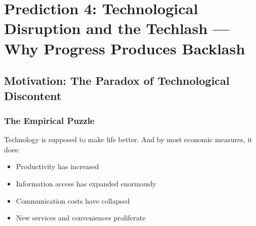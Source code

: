 \section{Prediction 4: Technological Disruption and the Techlash --- Why Progress Produces Backlash}
\label{app:prediction-techlash}


\begin{abstract}
This appendix provides the complete technical foundation for Prediction 4 of the 
Complementarity-Context Framework: that rapid technological change triggers 
``techlash''---public backlash against technology---not despite its benefits but 
\emph{because} of asymmetric effects across welfare dimensions. We develop the 
formal model linking technology shocks to context ($\Psi$) and welfare (FEPSDE), 
demonstrate how populations with different welfare weights experience net gains 
or losses, validate against survey data on technology attitudes, and derive 
demographic predictions for techlash concentration. The analysis explains why 
the most technologically advanced societies exhibit the strongest technology skepticism.
\end{abstract}

\subsection{Motivation: The Paradox of Technological Discontent}

\subsubsection{The Empirical Puzzle}

Technology is supposed to make life better. And by most economic measures, it does:
\begin{itemize}
    \item Productivity has increased
    \item Information access has expanded enormously
    \item Communication costs have collapsed
    \item New services and conveniences proliferate
\end{itemize}

